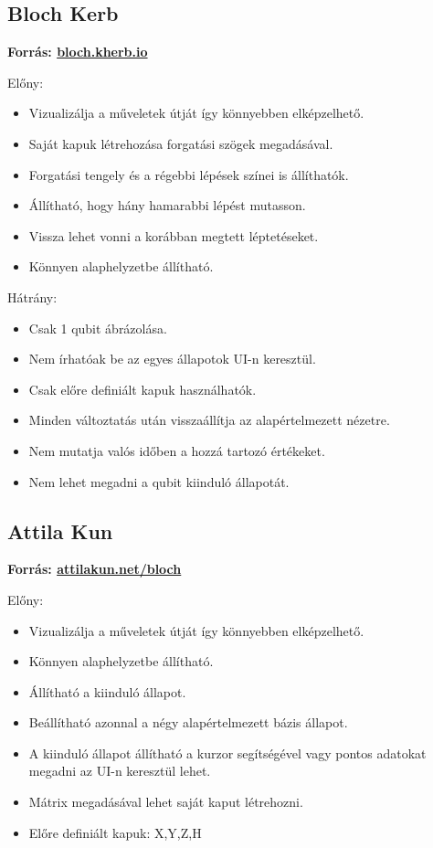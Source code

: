 \documentclass[fontsize=12pt,a4paper]{article}
\begin{document}
\vspace{0.4cm}
\subsection{Bloch Kerb}
\textbf{Forrás: \href{https://bloch.kherb.io/}{bloch.kherb.io}}

Előny:

\begin{itemize}
    \item Vizualizálja a műveletek útját így könnyebben elképzelhető.
    \item Saját kapuk létrehozása forgatási szögek megadásával.
    \item Forgatási tengely és a régebbi lépések színei is állíthatók.
    \item Állítható, hogy hány hamarabbi lépést mutasson.
    \item Vissza lehet vonni a korábban megtett léptetéseket.
    \item Könnyen alaphelyzetbe állítható.
\end{itemize}

Hátrány:

\begin{itemize}
    \item Csak 1 qubit ábrázolása.
    \item Nem írhatóak be az egyes állapotok UI-n keresztül.
    \item Csak előre definiált kapuk használhatók.
    \item Minden változtatás után visszaállítja az alapértelmezett nézetre.
    \item Nem mutatja valós időben a hozzá tartozó értékeket.
    \item Nem lehet megadni a qubit kiinduló állapotát.
\end{itemize}


\vspace{0.4cm}
\subsection{Attila Kun}
\textbf{Forrás: \href{https://attilakun.net/bloch/}{attilakun.net/bloch}}

Előny:

\begin{itemize}
    \item Vizualizálja a műveletek útját így könnyebben elképzelhető.
    \item Könnyen alaphelyzetbe állítható.
    \item Állítható a kiinduló állapot.
    \item Beállítható azonnal a négy alapértelmezett bázis állapot.
    \item A kiinduló állapot állítható a kurzor segítségével vagy pontos adatokat megadni az UI-n keresztül lehet.
    \item Mátrix megadásával lehet saját kaput létrehozni.
    \item Előre definiált kapuk: X,Y,Z,H
\end{itemize}
\end{document}
